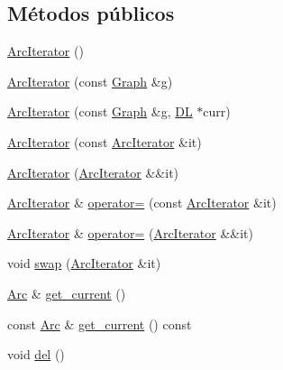 \subsection*{Métodos públicos}
\begin{DoxyCompactItemize}
\item 
\hyperlink{class_designar_1_1_graph_1_1_arc_iterator_a642cf08854577ea29ba520ee882c9d54}{Arc\+Iterator} ()
\item 
\hyperlink{class_designar_1_1_graph_1_1_arc_iterator_afeb58fdc5c6d4fd2d57c2ce53969203e}{Arc\+Iterator} (const \hyperlink{class_designar_1_1_graph}{Graph} \&g)
\item 
\hyperlink{class_designar_1_1_graph_1_1_arc_iterator_a2a9eb9d16ff5d80a22671dfdbe9ce3a2}{Arc\+Iterator} (const \hyperlink{class_designar_1_1_graph}{Graph} \&g, \hyperlink{class_designar_1_1_d_l}{DL} $\ast$curr)
\item 
\hyperlink{class_designar_1_1_graph_1_1_arc_iterator_a42fba48323675143026319401967e8c6}{Arc\+Iterator} (const \hyperlink{class_designar_1_1_graph_1_1_arc_iterator}{Arc\+Iterator} \&it)
\item 
\hyperlink{class_designar_1_1_graph_1_1_arc_iterator_a1446dc2d05faf881728a6721a9253129}{Arc\+Iterator} (\hyperlink{class_designar_1_1_graph_1_1_arc_iterator}{Arc\+Iterator} \&\&it)
\item 
\hyperlink{class_designar_1_1_graph_1_1_arc_iterator}{Arc\+Iterator} \& \hyperlink{class_designar_1_1_graph_1_1_arc_iterator_acce205d4f59317865d8a7e85598d141d}{operator=} (const \hyperlink{class_designar_1_1_graph_1_1_arc_iterator}{Arc\+Iterator} \&it)
\item 
\hyperlink{class_designar_1_1_graph_1_1_arc_iterator}{Arc\+Iterator} \& \hyperlink{class_designar_1_1_graph_1_1_arc_iterator_abd43d384ad590121f38d92d7af294195}{operator=} (\hyperlink{class_designar_1_1_graph_1_1_arc_iterator}{Arc\+Iterator} \&\&it)
\item 
void \hyperlink{class_designar_1_1_graph_1_1_arc_iterator_a12989f76c5a96637698000757b6dc6f4}{swap} (\hyperlink{class_designar_1_1_graph_1_1_arc_iterator}{Arc\+Iterator} \&it)
\item 
\hyperlink{class_designar_1_1_graph_a74c730ef4ce2d20f998d72bd25c2b5bf}{Arc} \& \hyperlink{class_designar_1_1_graph_1_1_arc_iterator_a4915ccaef38293e9dc449e7dba3965ec}{get\+\_\+current} ()
\item 
const \hyperlink{class_designar_1_1_graph_a74c730ef4ce2d20f998d72bd25c2b5bf}{Arc} \& \hyperlink{class_designar_1_1_graph_1_1_arc_iterator_ac7b91a766ed21ee9a69024d8a6548bbd}{get\+\_\+current} () const
\item 
void \hyperlink{class_designar_1_1_graph_1_1_arc_iterator_a6375bb0513856b2b20dffbfb2496082e}{del} ()
\end{DoxyCompactItemize}
